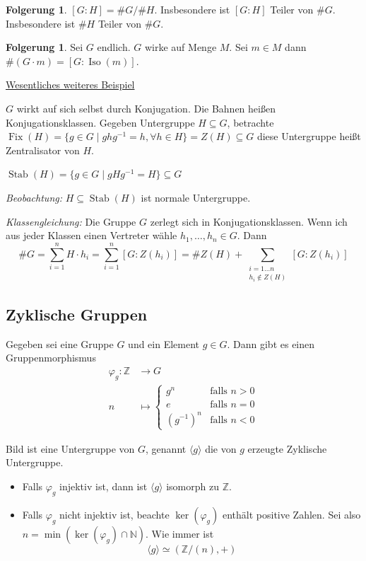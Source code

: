 \documentclass[12pt,parskip=full]{scrartcl}
\newcommand{\setN}{\mathbb{N}}
\newcommand{\setZ}{\mathbb{Z}}
\newcommand{\heading}{\underline}
\theoremstyle{definition}
\newtheorem{corollary}[theorem]{Folgerung}
\theoremstyle{remark}
\begin{document}
	\begin{corollary}
		$[G:H] = \#G/\#H$. Insbesondere ist $[G:H]$ Teiler von $\#G$. Insbesondere ist $\#H$ Teiler von $\#G$.
	\end{corollary}

	\begin{corollary}
		Sei $G$ endlich. $G$ wirke auf Menge $M$. Sei $m \in M$ dann $\# (G \cdot m) = [G: \operatorname{Iso}(m)]$.
	\end{corollary}

	\heading{Wesentliches weiteres Beispiel}
	
	$G$ wirkt auf sich selbst durch Konjugation. Die Bahnen heißen Konjugationsklassen. Gegeben Untergruppe $H \subseteq G$, betrachte $\operatorname{Fix}(H) = \{ g \in G \mid g h g^{-1} = h, \forall h \in H \} = Z(H) \subseteq G$ diese Untergruppe heißt Zentralisator von $H$.
	
	$\operatorname{Stab}(H) = \{ g \in G \mid g H g^{-1} = H \} \subseteq G$
	
	\textit{Beobachtung:} $H \subseteq \operatorname{Stab}(H)$ ist normale Untergruppe.
	
	\textit{Klassengleichung:} Die Gruppe $G$ zerlegt sich in Konjugationsklassen. Wenn ich aus jeder Klassen einen Vertreter wähle $h_1, \dots, h_n \in G$. Dann
	\begin{equation*}
		\#G = \sum_{i=1}^{n} H \cdot h_i = \sum_{i=1}^{n} [G: Z(h_i)] = \#Z(H) + \sum_{\substack{i = 1 \dots n \\ h_i \notin Z(H)}} [G:Z(h_i)]
	\end{equation*}
	
	\subsection{Zyklische Gruppen}

	Gegeben sei eine Gruppe $G$ und ein Element $g \in G$. Dann gibt es einen Gruppenmorphismus
	\begin{align*}
		\varphi_g: \setZ &\longrightarrow G \\
		n &\longmapsto \begin{cases}
			g^n & \text{falls } n > 0 \\
			e & \text{falls } n = 0 \\
			(g^{-1})^n & \text{falls } n < 0
		\end{cases}
	\end{align*}
	
	Bild ist eine Untergruppe von $G$, genannt $\langle g \rangle$ die von $g$ erzeugte Zyklische Untergruppe.
	\begin{itemize}
		\item Falls $\varphi_g$ injektiv ist, dann ist $\langle g \rangle$ isomorph zu $\setZ$.
		\item Falls $\varphi_g$ nicht injektiv ist, beachte $\ker(\varphi_g)$ enthält positive Zahlen. Sei also $n = \min (\ker(\varphi_g) \cap \setN)$. Wie immer ist
		\begin{equation*}
			\langle g \rangle \simeq (\setZ/(n), +)
		\end{equation*}
	\end{itemize}
\end{document}
